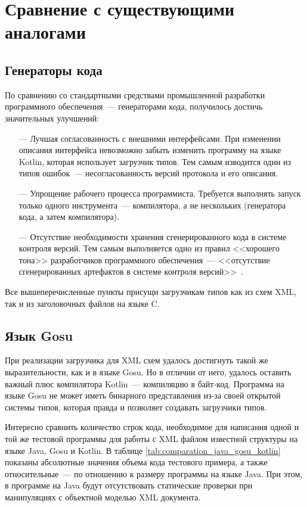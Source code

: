\section{Сравнение с существующими аналогами}

\subsection{Генераторы кода}\label{res:generators}
По сравнению со стандартными средствами промышленной разработки программного обеспечения~--- генераторами кода,
получилось достичь значительных улучшений:
\begin{itemize}
	\item[---] Лучшая согласованность с внешними интерфейсами. При изменении описания интерфейса невозможно забыть изменить программу на языке Kotlin, которая использует загрузчик типов. Тем самым изводится один из типов ошибок~--- несогласованность версий протокола и его описания.
	\item[---] Упрощение рабочего процесса программиста. Требуется выполнять запуск только одного инструмента~--- компилятора, а не нескольких (генератора кода, а затем компилятора).
	\item[---] Отсутствие необходимости хранения сгенерированного кода в системе контроля версий. Тем самым выполняется одно из правил <<хорошего тона>> разработчиков программного обеспечения~--- <<отсутствие сгенерированных артефактов в системе контроля версий>>~\cite{art-of-agile}.
\end{itemize}

Все вышеперечисленные пункты присущи загрузчикам типов как из схем XML, так и из заголовочных файлов на языке C.

\subsection{Язык Gosu}\label{xml-gosu-result}
При реализации загрузчика для XML схем удалось достигнуть такой же выразительности, как и в языке Gosu.
Но в отличии от него, удалось оставить важный плюс компилятора Kotlin~--- компиляцию в байт-код.
Программа на языке Gosu не может иметь бинарного представления из-за своей открытой системы типов,
которая правда и позволяет создавать загрузчики типов.

Интересно сравнить количество строк кода, необходимое для написания одной и той же тестовой программы для работы с XML файлом известной структуры на языке Java, Gosu и Kotlin. В таблице \ref{tab:comparation_java_gosu_kotlin} показаны абсолютные значения объема кода тестового примера, а также относительные~--- по отношению к размеру программы на языке Java.
При этом, в программе на Java будут отсутствовать статические проверки при манипуляциях с объектной моделью XML документа.


